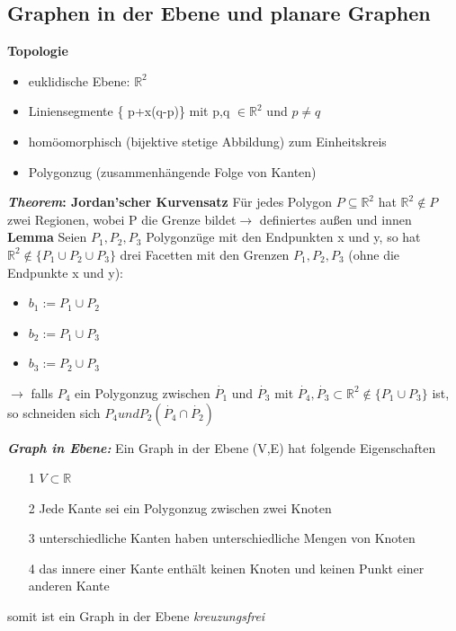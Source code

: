 \subsection{Graphen in der Ebene und planare Graphen}
\textbf{Topologie}
\begin{itemize}
	\item euklidische Ebene: $\mathbb{R}^2$ 
	\item Liniensegmente \{ p+x(q-p)\} mit p,q $\in \mathbb{R}^2$ und $p \neq q$
	\item homöomorphisch (bijektive stetige Abbildung) zum Einheitskreis
	\item Polygonzug (zusammenhängende Folge von Kanten)
\end{itemize}
\textbf{\textit{Theorem}: Jordan'scher Kurvensatz}\newline
Für jedes Polygon $P \subseteq \mathbb{R}^2$ hat $\mathbb{R}^2\notin P$ zwei Regionen, wobei P die Grenze bildet\newline $\rightarrow$ definiertes außen und innen \newline
\textbf{Lemma}\newline
Seien $P_1, P_2, P_3$ Polygonzüge mit den Endpunkten x und y, so hat $\mathbb{R}^2 \notin \{ P_1 \cup P_2 \cup P_3\}$ drei Facetten mit den Grenzen $P_1, P_2, P_3$ (ohne die Endpunkte x und y): 
\begin{itemize}
	\item{} $b_1 := P_1 \cup P_2$
	\item{} $b_2 := P_1 \cup P_3$
	\item{} $b_3 := P_2 \cup P_3$ 
\end{itemize}
$\rightarrow$ falls $P_4$ ein Polygonzug zwischen $\dot{P_1}$ und $\dot{P_3}$ mit $\dot{P_4}, \dot{P_3} \subset \mathbb{R}^2 \notin \{ P_1 \cup P_3\}$ ist, so schneiden sich $P_4 und P_2 (\dot{P_4} \cap \dot{P_2})$ \newline

\textbf{\textit{Graph in Ebene:}} \newline
Ein Graph in der Ebene (V,E) hat folgende Eigenschaften
\begin{itemize}
	\item[1] $V \subset \mathbb{R}$
	\item[2] Jede Kante sei ein Polygonzug zwischen zwei Knoten
	\item[3] unterschiedliche Kanten haben unterschiedliche Mengen von Knoten
	\item[4] das innere einer Kante enthält keinen Knoten und keinen Punkt einer anderen Kante 
\end{itemize}
somit ist ein Graph in der Ebene \textit{kreuzungsfrei} \newline


